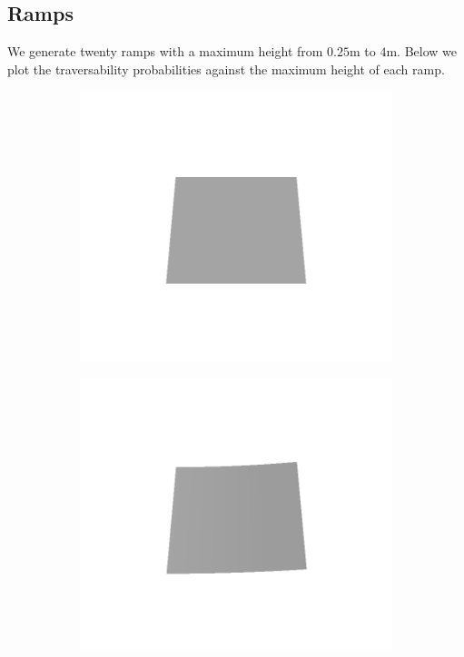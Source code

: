 \subsection{Ramps}
We generate twenty ramps with a maximum height from $0.25$m to $4$m. Below we plot the traversability probabilities against the maximum height of each ramp.

\begin{figure}[H]
    \centering
    \begin{subfigure}[b]{0.24\textwidth}
    \includegraphics[width=\linewidth]{../img/5/custom_patches/ramp/all/00-3d.png}
    \end{subfigure}
    \begin{subfigure}[b]{0.24\textwidth}
    \includegraphics[width=\linewidth]{../img/5/custom_patches/ramp/all/03-3d.png}

\end{subfigure}
\end{figure}
